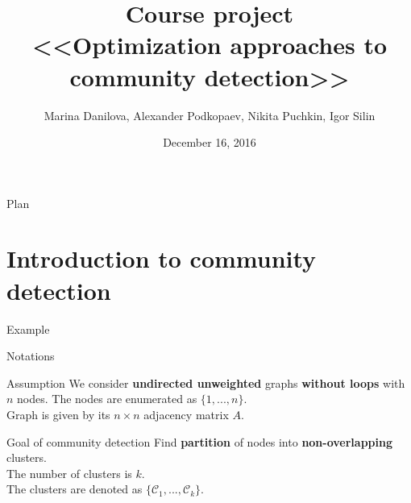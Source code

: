 \documentclass{beamer}
\theoremstyle{definition}
\theoremstyle{plain}
\theoremstyle{remark}
\begin{document}
\setlength{\abovedisplayskip}{5pt}
\setlength{\belowdisplayskip}{5pt}

	\title[\hbox to 60mm{Course project \hfill\insertframenumber\,/\,20}]
			{ Course project \\ <<Optimization approaches to community detection>>}
	\author[Igor Silin]{\large Marina Danilova, Alexander Podkopaev, Nikita Puchkin, Igor Silin}

\date{\footnotesize{December 16, 2016}}

	\begin{frame}
		\titlepage
	\end{frame}

	\begin{frame}{Plan}
		  \tableofcontents[
		    sectionstyle=show/show,
		    subsectionstyle=show/show/show
		  ]
	\end{frame}

	
	\section{Introduction to community detection}

			\begin{frame}{Example}
				\vspace{-17pt}
			\end{frame}
		
			\begin{frame}{Notations}

			\begin{block}{Assumption}
				We consider \textbf{undirected unweighted} graphs \textbf{without loops} with $n$ nodes.
				The nodes are enumerated as $\{ 1, ..., n\}$.\\
				Graph is given by its $n \times n $ adjacency matrix $A$.

			\end{block}

			\begin{block}{Goal of community detection}
				Find \textbf{partition} of nodes into \textbf{non-overlapping} clusters.\\
				The number of clusters is $k$.\\
				The clusters are denoted as $\{ \mathcal{C}_1, ..., \mathcal{C}_k\}$.
			\end{block}
		\end{frame}
\end{document}
